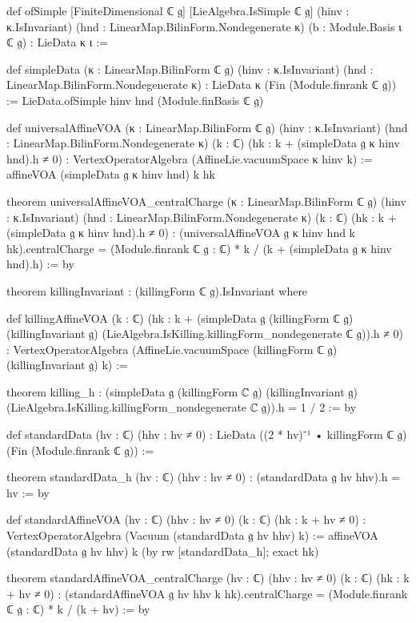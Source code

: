 \begin{leancode}
def ofSimple [FiniteDimensional ℂ 𝔤] [LieAlgebra.IsSimple ℂ 𝔤] (hinv : κ.IsInvariant)
    (hnd : LinearMap.BilinForm.Nondegenerate κ) (b : Module.Basis ι ℂ 𝔤) : LieData κ ι :=

def simpleData (κ : LinearMap.BilinForm ℂ 𝔤) (hinv : κ.IsInvariant)
    (hnd : LinearMap.BilinForm.Nondegenerate κ) : LieData κ (Fin (Module.finrank ℂ 𝔤)) :=
  LieData.ofSimple hinv hnd (Module.finBasis ℂ 𝔤)

def universalAffineVOA (κ : LinearMap.BilinForm ℂ 𝔤) (hinv : κ.IsInvariant)
    (hnd : LinearMap.BilinForm.Nondegenerate κ) (k : ℂ) (hk : k + (simpleData 𝔤 κ hinv hnd).h ≠ 0) :
    VertexOperatorAlgebra (AffineLie.vacuumSpace κ hinv k) :=
  affineVOA (simpleData 𝔤 κ hinv hnd) k hk

theorem universalAffineVOA_centralCharge (κ : LinearMap.BilinForm ℂ 𝔤) (hinv : κ.IsInvariant)
    (hnd : LinearMap.BilinForm.Nondegenerate κ) (k : ℂ) (hk : k + (simpleData 𝔤 κ hinv hnd).h ≠ 0) :
    (universalAffineVOA 𝔤 κ hinv hnd k hk).centralCharge =
      (Module.finrank ℂ 𝔤 : ℂ) * k / (k + (simpleData 𝔤 κ hinv hnd).h) := by

theorem killingInvariant : (killingForm ℂ 𝔤).IsInvariant where

def killingAffineVOA (k : ℂ)
    (hk : k + (simpleData 𝔤 (killingForm ℂ 𝔤) (killingInvariant 𝔤)
      (LieAlgebra.IsKilling.killingForm_nondegenerate ℂ 𝔤)).h ≠ 0) :
    VertexOperatorAlgebra (AffineLie.vacuumSpace (killingForm ℂ 𝔤) (killingInvariant 𝔤) k) :=

theorem killing_h :
    (simpleData 𝔤 (killingForm ℂ 𝔤) (killingInvariant 𝔤)
      (LieAlgebra.IsKilling.killingForm_nondegenerate ℂ 𝔤)).h = 1 / 2 := by

def standardData (hv : ℂ) (hhv : hv ≠ 0) :
    LieData ((2 * hv)⁻¹ • killingForm ℂ 𝔤) (Fin (Module.finrank ℂ 𝔤)) :=

theorem standardData_h (hv : ℂ) (hhv : hv ≠ 0) :
    (standardData 𝔤 hv hhv).h = hv := by

def standardAffineVOA (hv : ℂ) (hhv : hv ≠ 0) (k : ℂ) (hk : k + hv ≠ 0) :
    VertexOperatorAlgebra (Vacuum (standardData 𝔤 hv hhv) k) :=
  affineVOA (standardData 𝔤 hv hhv) k (by rw [standardData_h]; exact hk)

theorem standardAffineVOA_centralCharge (hv : ℂ) (hhv : hv ≠ 0) (k : ℂ)
    (hk : k + hv ≠ 0) :
    (standardAffineVOA 𝔤 hv hhv k hk).centralCharge = (Module.finrank ℂ 𝔤 : ℂ) * k / (k + hv) := by
\end{leancode}

